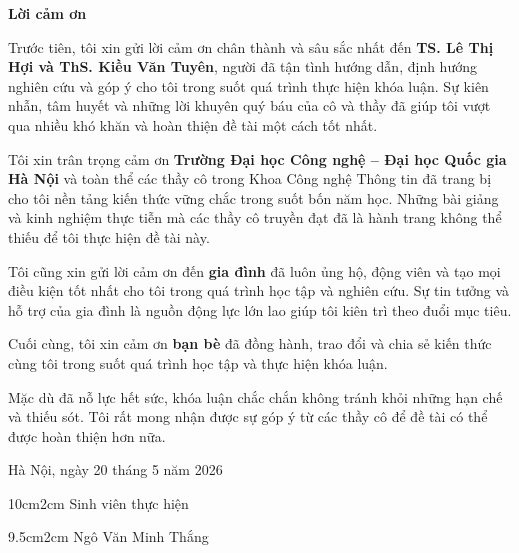 \begin{center}
\textbf{\large{Lời cảm ơn}}
\end{center}

Trước tiên, tôi xin gửi lời cảm ơn chân thành và sâu sắc nhất đến \textbf{TS. Lê Thị Hợi và ThS. Kiều Văn Tuyên}, người đã tận tình hướng dẫn, định hướng nghiên cứu và góp ý cho tôi trong suốt quá trình thực hiện khóa luận. Sự kiên nhẫn, tâm huyết và những lời khuyên quý báu của cô và thầy đã giúp tôi vượt qua nhiều khó khăn và hoàn thiện đề tài một cách tốt nhất.

Tôi xin trân trọng cảm ơn \textbf{Trường Đại học Công nghệ -- Đại học Quốc gia Hà Nội} và toàn thể các thầy cô trong Khoa Công nghệ Thông tin đã trang bị cho tôi nền tảng kiến thức vững chắc trong suốt bốn năm học. Những bài giảng và kinh nghiệm thực tiễn mà các thầy cô truyền đạt đã là hành trang không thể thiếu để tôi thực hiện đề tài này.

Tôi cũng xin gửi lời cảm ơn đến \textbf{gia đình} đã luôn ủng hộ, động viên và tạo mọi điều kiện tốt nhất cho tôi trong quá trình học tập và nghiên cứu. Sự tin tưởng và hỗ trợ của gia đình là nguồn động lực lớn lao giúp tôi kiên trì theo đuổi mục tiêu.

Cuối cùng, tôi xin cảm ơn \textbf{bạn bè} đã đồng hành, trao đổi và chia sẻ kiến thức cùng tôi trong suốt quá trình học tập và thực hiện khóa luận.

Mặc dù đã nỗ lực hết sức, khóa luận chắc chắn không tránh khỏi những hạn chế và thiếu sót. Tôi rất mong nhận được sự góp ý từ các thầy cô để đề tài có thể được hoàn thiện hơn nữa.

\begin{flushright}
Hà Nội, ngày 20 tháng 5 năm 2026
\end{flushright}

\begin{changemargin}{10cm}{2cm}
Sinh viên thực hiện
\\[2cm]
\end{changemargin}

\begin{changemargin}{9.5cm}{2cm}
Ngô Văn Minh Thắng
\end{changemargin}
